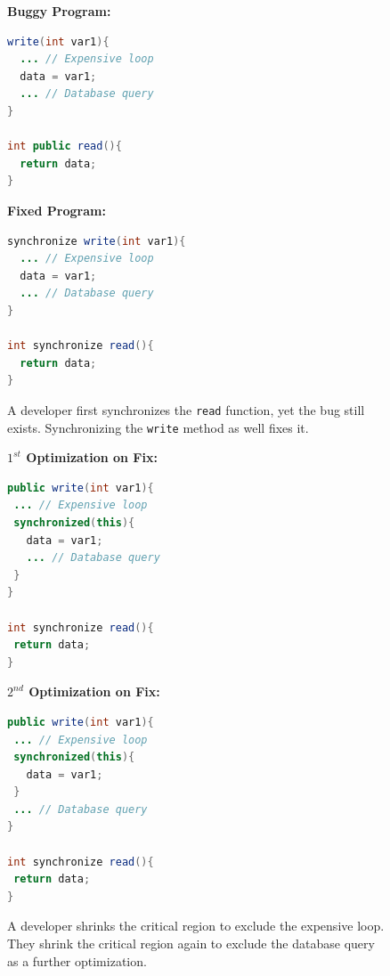 \documentclass{llncs}
\begin{document}
\begin{figure}[h]
\begin{minipage}{5cm}
\footnotesize{\textbf{Buggy Program:}}
\begin{lstlisting}[language=Java, morekeywords={synchronize}]
write(int var1){
  ... // Expensive loop
  data = var1;
  ... // Database query
}

int public read(){
  return data;
}
\end{lstlisting}
\end{minipage}\hfill
\begin{minipage}{5cm}
\footnotesize{\textbf{Fixed Program:}}
\begin{lstlisting}[language=Java, morekeywords={synchronize}]
synchronize write(int var1){
  ... // Expensive loop
  data = var1;
  ... // Database query
}

int synchronize read(){
  return data;
}
\end{lstlisting}
\end{minipage}
\caption{A developer first synchronizes the \texttt{read} function, yet the bug
still exists. Synchronizing the \texttt{write} method as well fixes it.}
\label{fig:fixed_sample_datarace}
\end{figure}

\begin{figure}[t]
\begin{minipage}{5cm}
\footnotesize{\textbf{$1^{st}$ Optimization on Fix:}}
\begin{lstlisting}[language=Java, morekeywords={synchronize}]
public write(int var1){
 ... // Expensive loop
 synchronized(this){
   data = var1;
   ... // Database query
 }
}

int synchronize read(){
 return data;
}
\end{lstlisting}
\end{minipage}\hfill
\begin{minipage}{5cm}
\footnotesize{\textbf{$2^{nd}$ Optimization on Fix:}}
\begin{lstlisting}[language=Java, morekeywords={synchronize}]
public write(int var1){
 ... // Expensive loop
 synchronized(this){
   data = var1;
 }
 ... // Database query
}

int synchronize read(){
 return data;
}
\end{lstlisting}
\end{minipage}
\caption{A developer shrinks the critical region to exclude the expensive loop.
They shrink the critical region again to exclude the database query as a
further optimization.}
\label{fig:optimized_sample_datarace}
\end{figure}
\end{document}
